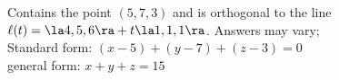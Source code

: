 {Contains the point $(5,7,3)$ and is orthogonal to the line\\
$\ell(t) =  \la 4,5,6\ra+ t\la 1,1,1\ra$.
}
{Answers may vary;\\
Standard form: $(x-5)+(y-7)+(z-3)=0$\\
general form: $x+y+z=15$
}

